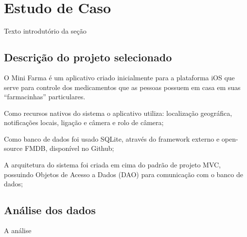 \chapter{Estudo de Caso} \label{estudodecaso}

Texto introdutório da seção

\section{Descrição do projeto selecionado} \label{subsec:descricaodoprojeto}

O Mini Farma é um aplicativo criado inicialmente para a plataforma iOS que serve para controle dos medicamentos que as 
pessoas possuem em casa em suas ``farmacinhas'' particulares.


Como recursos nativos do sistema o aplicativo utiliza: localização geográfica, notificações locais, ligação e 
câmera e rolo de câmera;


Como banco de dados foi usado SQLite, através do framework externo e open-source FMDB, disponível no Github;


A arquitetura do sistema foi criada em cima do padrão de projeto MVC, 
possuindo Objetos de Acesso a Dados (DAO) para comunicação com o banco de dados;


\section{Análise dos dados} \label{sec:analise}

A análise